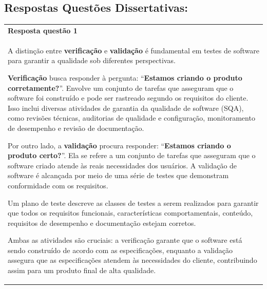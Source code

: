 \documentclass[
]{book}
\begin{document}
\subsection{Respostas Questões Dissertativas:}\label{respostas-questuxf5es-dissertativas}

\begin{longtable}[]{@{}
  >{\raggedright\arraybackslash}p{}@{}}
\toprule\noalign{}
\endhead
\bottomrule\noalign{}
\endlastfoot
\textbf{Resposta questão 1} \\
A distinção entre \textbf{verificação} e \textbf{validação} é fundamental em testes de software para garantir a qualidade sob diferentes perspectivas.

\textbf{Verificação} busca responder à pergunta: ``\textbf{Estamos criando o produto corretamente?}''. Envolve um conjunto de tarefas que asseguram que o software foi construído e pode ser rastreado segundo os requisitos do cliente. Isso inclui diversas atividades de garantia da qualidade de software (SQA), como revisões técnicas, auditorias de qualidade e configuração, monitoramento de desempenho e revisão de documentação.

Por outro lado, a \textbf{validação} procura responder: ``\textbf{Estamos criando o produto certo?}''. Ela se refere a um conjunto de tarefas que asseguram que o software criado atende às reais necessidades dos usuários. A validação de software é alcançada por meio de uma série de testes que demonstram conformidade com os requisitos.

Um plano de teste descreve as classes de testes a serem realizados para garantir que todos os requisitos funcionais, características comportamentais, conteúdo, requisitos de desempenho e documentação estejam corretos.

Ambas as atividades são cruciais: a verificação garante que o software está sendo construído de acordo com as especificações, enquanto a validação assegura que as especificações atendem às necessidades do cliente, contribuindo assim para um produto final de alta qualidade. \\
\end{longtable}
\end{document}
